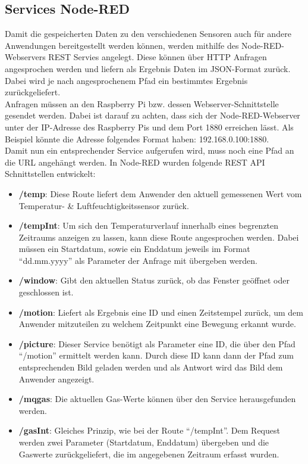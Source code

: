 \subsection{Services Node-RED}
Damit die gespeicherten Daten zu den verschiedenen Sensoren auch für andere Anwendungen bereitgestellt werden können, werden mithilfe des Node-RED-Webservers REST Servies angelegt. Diese können über \ac{HTTP} Anfragen angesprochen werden und liefern als Ergebnis Daten im \ac{JSON}-Format zurück. Dabei wird je nach angesprochenem Pfad ein bestimmtes Ergebnis zurückgeliefert. \\Anfragen müssen an den Raspberry Pi bzw. dessen Webserver-Schnittstelle gesendet werden. Dabei ist darauf zu achten, dass sich der Node-RED-Webserver unter der \ac{IP}-Adresse des Raspberry Pis und dem Port 1880 erreichen lässt. Als Beispiel könnte die Adresse folgendes Format haben: 192.168.0.100:1880. \\Damit nun ein entsprechender Service aufgerufen wird, muss noch eine Pfad an die \ac{URL} angehängt werden. In Node-RED wurden folgende REST \ac{API} Schnittstellen entwickelt:
\begin{itemize}
	\item \textbf{/temp}: Diese Route liefert dem Anwender den aktuell gemessenen Wert vom Temperatur- \& Luftfeuchtigkeitssensor  zurück. 
	\item \textbf{/tempInt}: Um sich den Temperaturverlauf innerhalb eines begrenzten Zeitraums anzeigen zu lassen, kann diese Route angesprochen werden. Dabei müssen ein Startdatum, sowie ein Enddatum jeweils im Format \enquote{dd.mm.yyyy} als Parameter der Anfrage mit übergeben werden.
	\item \textbf{/window}: Gibt den aktuellen Status zurück, ob das Fenster geöffnet oder geschlossen ist.
	\item \textbf{/motion}: Liefert als Ergebnis eine ID und einen Zeitstempel zurück, um dem Anwender mitzuteilen zu welchem Zeitpunkt eine Bewegung erkannt wurde.
	\item \textbf{/picture}: Dieser Service benötigt als Parameter eine ID, die über den Pfad \enquote{/motion} ermittelt werden kann. Durch diese ID kann dann der Pfad zum entsprechenden Bild geladen werden und als Antwort wird das Bild dem Anwender angezeigt.
	\item \textbf{/mqgas}: Die aktuellen Gas-Werte können über den Service herausgefunden werden.
	\item \textbf{/gasInt}: Gleiches Prinzip, wie bei der Route \enquote{/tempInt}. Dem Request werden zwei Parameter (Startdatum, Enddatum) übergeben und die Gaswerte zurückgeliefert, die im angegebenen Zeitraum erfasst wurden.
\end{itemize}

